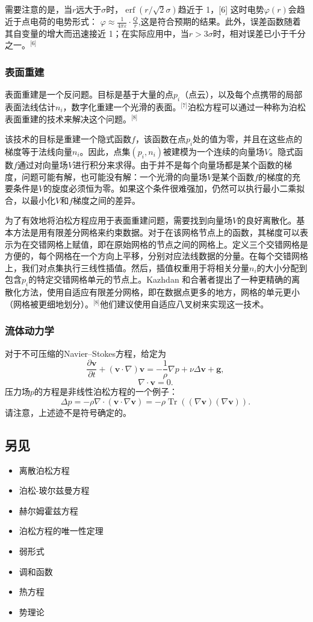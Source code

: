 需要注意的是，当\(r\)远大于\(\sigma\)时，\(\operatorname{erf}(r / \sqrt{2} \sigma)\)趋近于 1，[6] 这时电势\(\varphi(r)\)会趋近于点电荷的电势形式：
\(\varphi \approx \frac{1}{4\pi \varepsilon} \cdot \frac{Q}{r}\),这是符合预期的结果。此外，误差函数随着其自变量的增大而迅速接近 1；在实际应用中，当\(r > 3\sigma\)时，相对误差已小于千分之一。\(^\text{[6]}\)
\subsubsection{表面重建}
表面重建是一个反问题。目标是基于大量的点\(p_i\)（点云），以及每个点携带的局部表面法线估计\(n_i\)，数字化重建一个光滑的表面。\(^\text{[7]}\)泊松方程可以通过一种称为泊松表面重建的技术来解决这个问题。\(^\text{[8]}\)

该技术的目标是重建一个隐式函数\(f\)，该函数在点\(p_i\)处的值为零，并且在这些点的梯度等于法线向量\(n_i\)。因此，点集\((p_i, n_i)\)被建模为一个连续的向量场\(V\)。隐式函数\(f\)通过对向量场\(V\)进行积分来求得。由于并不是每个向量场都是某个函数的梯度，问题可能有解，也可能没有解：一个光滑的向量场\(V\)是某个函数\(f\)的梯度的充要条件是\(V\)的旋度必须恒为零。如果这个条件很难强加，仍然可以执行最小二乘拟合，以最小化\(V\)和\(f\)梯度之间的差异。

为了有效地将泊松方程应用于表面重建问题，需要找到向量场\(V\)的良好离散化。基本方法是用有限差分网格来约束数据。对于在该网格节点上的函数，其梯度可以表示为在交错网格上赋值，即在原始网格的节点之间的网格上。定义三个交错网格是方便的，每个网格在一个方向上平移，分别对应法线数据的分量。在每个交错网格上，我们对点集执行三线性插值。然后，插值权重用于将相关分量\(n_i\)的大小分配到包含\(p_i\)的特定交错网格单元的节点上。Kazhdan 和合著者提出了一种更精确的离散化方法，使用自适应有限差分网格，即在数据点更多的地方，网格的单元更小（网格被更细地划分）。\(^\text{[8]}\)他们建议使用自适应八叉树来实现这一技术。
\subsubsection{流体动力学}
对于不可压缩的Navier–Stokes方程，给定为  
\[
\frac{\partial \mathbf{v}}{\partial t} + (\mathbf{v} \cdot \nabla) \mathbf{v} = -\frac{1}{\rho} \nabla p + \nu \Delta \mathbf{v} + \mathbf{g},~
\]
\[
\nabla \cdot \mathbf{v} = 0.~
\]
压力场\(p\)的方程是非线性泊松方程的一个例子：  
\[
\Delta p = -\rho \nabla \cdot (\mathbf{v} \cdot \nabla \mathbf{v}) = -\rho \operatorname{Tr} \left( (\nabla \mathbf{v})(\nabla \mathbf{v}) \right).~
\]  
请注意，上述迹不是符号确定的。
\subsection{另见}  
\begin{itemize}
\item 离散泊松方程  
\item 泊松-玻尔兹曼方程  
\item 赫尔姆霍兹方程  
\item 泊松方程的唯一性定理  
\item 弱形式  
\item 调和函数  
\item 热方程  
\item 势理论
\end{itemize}
